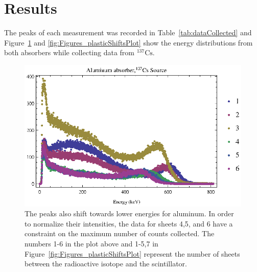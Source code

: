 

\section{Results} %
\label{sec:results}
The peaks of each measurement was recorded in Table~\ref{tab:dataCollected} and Figure~\ref{fig:Figures_aluminumShiftsPlot} and \ref{fig:Figures_plasticShiftsPlot} show the energy distributions from both absorbers while collecting data from $^{137}\text{Cs}$.
\begin{figure}[tbp]
	\centering
		\includegraphics[width=\MyWidth]{Figures/aluminumShiftsPlot.eps}
	\caption{The peaks also shift towards lower energies for aluminum. In order to normalize their intensities, the data for sheets 4,5, and 6 have a constraint on the maximum number of counts collected.  The numbers 1-6 in the plot above and 1-5,7 in Figure~\ref{fig:Figures_plasticShiftsPlot} represent the number of sheets between the radioactive isotope and the scintillator.}
	\label{fig:Figures_aluminumShiftsPlot}
\end{figure}%
